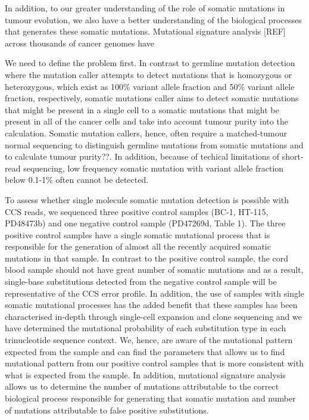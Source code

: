 In addition, to our greater understanding of the role of somatic mutations in tumour evolution, we also have a better understanding of the biological processes that generates these somatic mutations. Mutational signature analysis [REF] across thousands of cancer genomes have   


We need to define the problem first. In contrast to germline mutation detection where the mutation caller attempts to detect mutations that is homozygous or heterozygous, which exist as 100\% variant allele fraction and 50\% variant allele fraction, respectively, somatic mutations caller aims to detect somatic mutations that might be present in a single cell to a somatic mutations that might be present in all of the cancer cells and take into account tumour purity into the calculation. Somatic mutation callers, hence, often require a matched-tumour normal sequencing to distinguish germline mutations from somatic mutations and to calculate tumour purity??. In addition, because of techical limitations of short-read sequencing, low frequency somatic mutation with variant allele fraction below 0.1-1\% often cannot be detected. 


To assess whether single molecule somatic mutation detection is possible with CCS reads, we sequenced three positive control samples (BC-1, HT-115, PD48473b) and one negative control sample (PD47269d, Table 1). The three positive control samples have a single somatic mutational process that is responsible for the generation of almost all the recently acquired somatic mutations in that sample. In contrast to the positive control sample, the cord blood sample should not have great number of somatic mutations and as a result, single-base substitutions detected from the negative control sample will be representative of the CCS error profile. In addition, the use of samples with single somatic mutational processes has the added benefit that these samples has been characterised in-depth through single-cell expansion and clone sequencing and we have determined the mutational probability of each substitution type in each trinucleotide sequence context. We, hence, are aware of the mutational pattern expected from the sample and can find the parameters that allows us to find mutational pattern from our positive control samples that is more consistent with what is expected from the sample. In addition, mutational signature analysis allows us to determine the number of mutations attributable to the correct biological process responsible for generating that somatic mutation and number of mutations attributable to false positive substitutions. 


